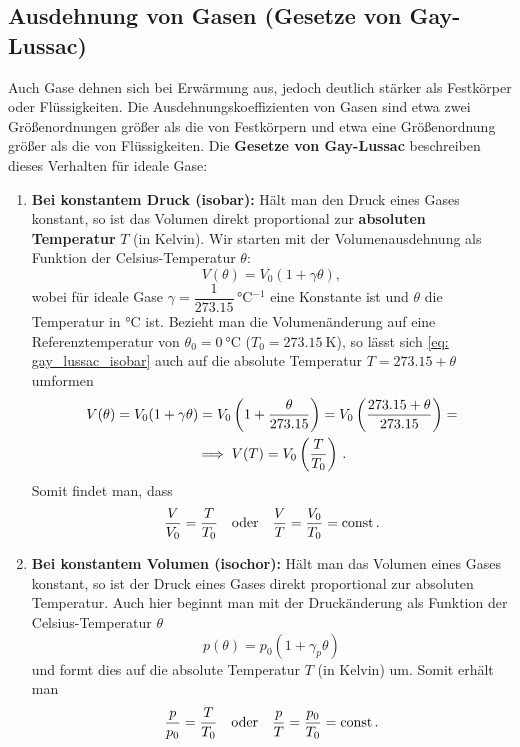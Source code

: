 \subsection{Ausdehnung von Gasen (Gesetze von Gay-Lussac)}\label{subsec: ausdehnung_gase}
Auch Gase dehnen sich bei Erwärmung aus, jedoch deutlich stärker als Festkörper oder Flüssigkeiten. Die Ausdehnungskoeffizienten von Gasen sind etwa zwei Größenordnungen größer als die von Festkörpern und etwa eine Größenordnung größer als die von Flüssigkeiten. Die \textbf{Gesetze von Gay-Lussac} beschreiben dieses Verhalten für ideale Gase:
\begin{enumerate}
    \item \textbf{Bei konstantem Druck (isobar):} Hält man den Druck eines Gases konstant, so ist das Volumen direkt proportional zur \textbf{absoluten Temperatur} $T$ (in Kelvin). Wir starten mit der Volumenausdehnung als Funktion der Celsius-Temperatur $\theta$:
    \begin{equation}\label{eq: gay_lussac_isobar}
        V(\theta) = V_0(1 + \gamma \theta), %
    \end{equation}
    wobei für ideale Gase $\gamma = \dfrac{1}{\num{273.15}}\,\si{\celsius^{-1}}$ eine Konstante ist und $\theta$ die Temperatur in $\si{\celsius}$ ist. Bezieht man die Volumenänderung auf eine Referenztemperatur von $\theta_0 = \SI{0}{\celsius}$ ($T_0 = \SI{273.15}{\kelvin}$), so lässt sich \cref{eq: gay_lussac_isobar} auch auf die absolute Temperatur $T = \qty{273.15} + \theta$ umformen  
    \begin{equation} \begin{gathered}
        V(\theta) = V_0(1+\gamma \theta) = V_0 \left(1 + \frac{\theta}{\num{273.15}} \right) = V_0\left( \frac{\num{273.15} + \theta}{\num{273.15}} \right) = \\
        \implies V(T) = V_0 \left( \frac{T}{T_0} \right) \,.
    \end{gathered}\end{equation}
    Somit findet man, dass 
    \begin{equation}\label{eq: gay_lussac_V_ueber_V0}
        \frac{V}{V_0} = \frac{T}{T_0} \quad \text{oder} \quad \frac{V}{T} = \frac{V_0}{T_0} = \mathrm{const} \,.
    \end{equation}
    \item \textbf{Bei konstantem Volumen (isochor):} Hält man das Volumen eines Gases konstant, so ist der Druck eines Gases direkt proportional zur absoluten Temperatur. Auch hier beginnt man mit der Druckänderung als Funktion der Celsius-Temperatur $\theta$
    \begin{equation}
        p(\theta) = p_0(1 + \gamma_p \theta)
    \end{equation}
    und formt dies auf die absolute Temperatur $T$ (in Kelvin) um. Somit erhält man 
    \begin{equation}\label{eq: gay_lussac_p_ueber_p0}
        \frac{p}{p_0} = \frac{T}{T_0} \quad \text{oder} \quad \frac{p}{T} = \frac{p_0}{T_0} = \mathrm{const} \,.
    \end{equation}
\end{enumerate}
